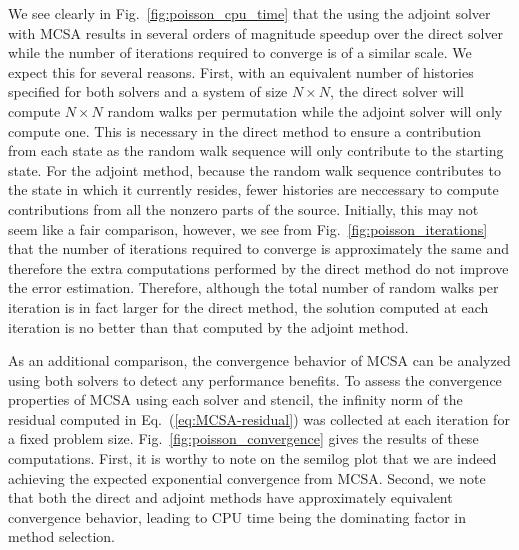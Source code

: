 \documentclass[preprint,12pt]{elsarticle}
\begin{document}
We see clearly in Fig.~\ref{fig:poisson_cpu_time} that the using the
adjoint solver with MCSA results in several orders of magnitude
speedup over the direct solver while the number of iterations required
to converge is of a similar scale. We expect this for several
reasons. First, with an equivalent number of histories specified for
both solvers and a system of size $N \times N$, the direct solver will
compute $N \times N$ random walks per permutation while the adjoint
solver will only compute one. This is necessary in the direct method
to ensure a contribution from each state as the random walk sequence
will only contribute to the starting state. For the adjoint method,
because the random walk sequence contributes to the state in which it
currently resides, fewer histories are neccessary to compute
contributions from all the nonzero parts of the source. Initially,
this may not seem like a fair comparison, however, we see from
Fig.~\ref{fig:poisson_iterations} that the number of iterations
required to converge is approximately the same and therefore the extra
computations performed by the direct method do not improve the error
estimation. Therefore, although the total number of random walks per
iteration is in fact larger for the direct method, the solution
computed at each iteration is no better than that computed by the
adjoint method.

As an additional comparison, the convergence behavior of MCSA can be
analyzed using both solvers to detect any performance benefits. To
assess the convergence properties of MCSA using each solver and
stencil, the infinity norm of the residual computed in
Eq.~(\ref{eq:MCSA-residual}) was collected at each iteration for a
fixed problem size. Fig.~\ref{fig:poisson_convergence} gives the
results of these computations. First, it is worthy to note on the
semilog plot that we are indeed achieving the expected exponential
convergence from MCSA. Second, we note that both the direct and
adjoint methods have approximately equivalent convergence behavior,
leading to CPU time being the dominating factor in method selection.
\end{document}

